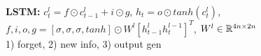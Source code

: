 \textbf{LSTM:} $c_t^l = f \odot c_{t-1}^l + i \odot g$,
$h_t = o \odot tanh(c_t^l)$,\\
$f,i,o, g = [\sigma,\sigma,\sigma,tanh]\odot W^l[h_{t-1}^l h_t^{l-1}]^T$, $W^l \in \mathbb{R}^{4n \times 2n}$\\
1) forget, 2) new info, 3) output gen\\

